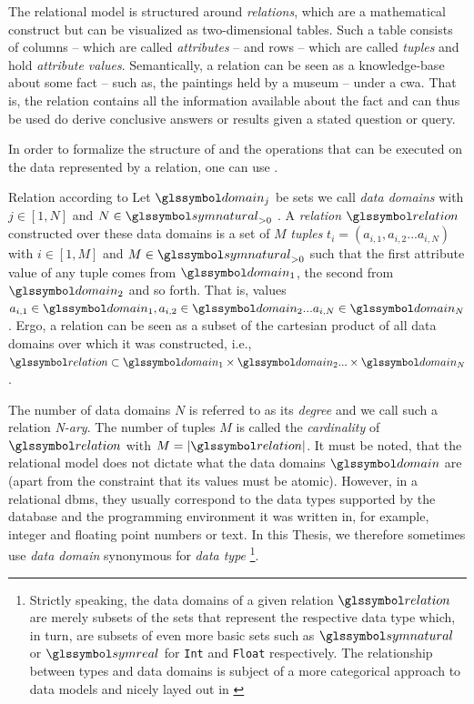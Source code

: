 The relational model is structured around \emph{relations}, which are a mathematical construct but can be visualized as two-dimensional tables. Such a table consists of columns -- which are called \emph{attributes} -- and rows -- which are called \emph{tuples} and hold \emph{attribute values}. Semantically, a relation can be seen as a knowledge-base about some fact -- such as, the paintings held by a museum -- under a \gls{cwa}{}. That is, the relation contains all the information available about the fact and can thus be used do derive conclusive answers or results given a stated question or query.

In order to formalize the structure of and the operations that can be executed on the data represented by a relation, one can use . 

\begin{definition}[label=definition:relation]{Relation according to \cite{Codd:1970Relational}}{}
    Let $\domain_j$ be sets we call \emph{data domains} with $j \in \left[ 1, N \right]$ and $N \in \symnatural_{> 0}$ . A \emph{relation} $\relation$ constructed over these data domains is a set of $M$ \emph{tuples} $t_i = (a_{i,1}, a_{i,2} ... a_{i,N})$ with $i \in \left[ 1, M \right]$ and $M \in \symnatural_{> 0}$ such that the first attribute value of any tuple comes from $\domain_1$, the second from $\domain_2$ and so forth. That is, values $a_{i,1} \in \domain_1, a_{i,2} \in \domain_2 ... a_{i,N} \in \domain_N$. Ergo, a relation can be seen as a subset of the cartesian product of all data domains over which it was constructed, i.e., $\relation \subset \domain_1 \times \domain_2 ... \times \domain_N$.
\end{definition}

The number of data domains $N$ is referred to as its \emph{degree} and we call such a relation \emph{N-ary}. The number of tuples $M$ is called the \emph{cardinality} of $\relation$ with $M = |\relation|$. It must be noted, that the relational model does not dictate what the data domains $\domain$ are (apart from the constraint that its values must be atomic). However, in a relational \acrshort{dbms}, they usually correspond to the data types supported by the database and the programming environment it was written in, for example, integer and floating point numbers or text. In this Thesis, we therefore sometimes use \emph{data domain} synonymous for \emph{data type} \footnote{Strictly speaking, the data domains of a given relation $\relation$ are merely subsets of the sets that represent the respective data type which, in turn, are subsets of even more basic sets such as $\symnatural$ or $\symreal$ for \lstinline{Int} and \lstinline{Float} respectively. The relationship between types and data domains is subject of a more categorical approach to data models and nicely layed out in \cite{Spivak:2009Simplicial}}.

